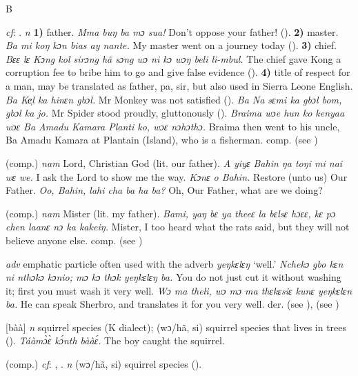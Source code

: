 \begin{letter}{B}

 \textit{cf}: . \textit{n} \textbf{1)} father. \textit{Mma buŋ ba mɔ sua!} Don't oppose your father! (\citealt{Pichl1967}). \textbf{2)} master. \textit{Ba mi koŋ kɔn bias ay nante.} My master went on a journey today (\citealt{Pichl1967}). \textbf{3)} chief. \textit{Bɛɛ lɛ Kɔng kol sirɔng hã sɔng wɔ ni kɔ wɔŋ beli li-mbul.} The chief gave Kong a corruption fee to bribe him to go and give false evidence (\citealt{Pichl1967}). \textbf{4)} title of respect for a man, may be translated as father, pa, sir, but also used in Sierra Leone English. \textit{Ba Ke̹l ka hinɛn gbɔl.} Mr Monkey was not satisfied (\citealt{Pichl1967}). \textit{Ba Na sɛmi ka gbɔl bom, gbɔl ka jo.} Mr Spider stood proudly, gluttonously (\citealt{Pichl1967}). \textit{Braima wɔe hun ko kenyaa wɔɛ Ba Amadu Kamara Planti ko, wɔɛ nɔhɔthɔ.} Braima then went to his uncle, Ba Amadu Kamara at Plantain (Island), who is a fisherman. comp.  (see )

 (comp.) \textit{nam} Lord, Christian God (lit. our father). \textit{A yiyɛ Bahin ŋa toŋi mi nai wɛ we.} I ask the Lord to show me the way. \textit{Kɔnɛ o Bahin.} Restore (unto us) Our Father. \textit{Oo, Bahin, lahi cha ba ha ba?} Oh, Our Father, what are we doing? 

 (comp.) \textit{nam} Mister (lit. my father). \textit{Bami, yaŋ bɛ ya theeɛ la bɛlsɛ hɔɛɛ, kɛ pɔ chen laanɛ nɔ ka kakeiŋ.} Mister, I too heard what the rats said, but they will not believe anyone else. comp.  (see ) 
 
 \textit{adv} emphatic particle often used with the adverb \textit{yeŋkɛlɛŋ} ‘well.' \textit{Nchekɔ gbo kɛn ni nthɔkɔ kɔnio; mɔ kɔ thɔk yeŋkɛlɛŋ ba.} You do not just cut it without washing it; first you must wash it very well. \textit{Wɔ ma theli, wɔ mɔ ma thɛkɛsiɛ kunɛ yeŋkɛlɛn ba.} He can speak Sherbro, and translates it for you very well. der.  (see ),  (see ) 

 [bàà] \textit{n} squirrel species (K dialect); (wɔ/hã, si) squirrel species that lives in trees (\citealt{Pichl1967}). \textit{Táàmɔ̀ɛ̀ kɔ́nth bààɛ́.} The boy caught the squirrel.

 (comp.) \textit{cf}: , . \textit{n} (wɔ/hã, si) squirrel species (\citealt{Pichl1967}).


\end{letter}
